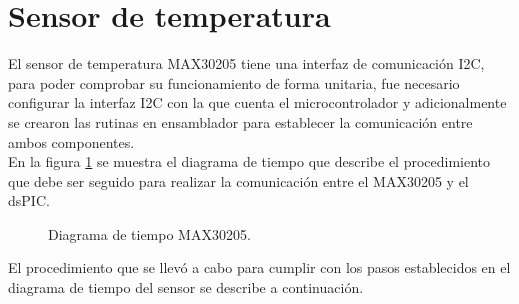\newpage
\section{Sensor de temperatura}

El sensor de temperatura MAX30205 tiene una interfaz de comunicación I2C, para poder comprobar su funcionamiento de forma unitaria, fue necesario configurar la interfaz I2C con la que cuenta el microcontrolador y adicionalmente se crearon las rutinas en ensamblador para establecer la comunicación entre ambos componentes.\\

En la figura \ref{fig:DiagramaMAX30205} se muestra el diagrama de tiempo que describe el procedimiento que debe ser seguido para realizar la comunicación entre el MAX30205 y el dsPIC.\\


\begin{figure}[htbp!]
	\centering
	\caption{Diagrama de tiempo MAX30205.}
	\label{fig:DiagramaMAX30205}
\end{figure}

El procedimiento que se llevó a cabo para cumplir con los pasos establecidos en el diagrama de tiempo del sensor se describe a continuación.

